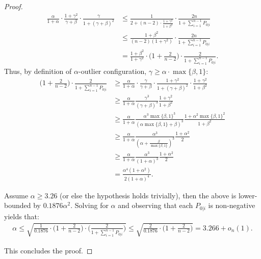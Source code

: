 \begin{proof}


\begin{align*}
    \frac{\alpha}{{1+\alpha}} \cdot \frac{1+\gamma^2}{\gamma+\beta} \cdot \frac{\gamma}{1+(\gamma+\beta)^2} 
    &\leq \frac{1}{2 + (n-2)\cdot \frac{1+\gamma^2}{1+\beta^2}}\cdot \frac{2n}{1 + \sum_{i=1}^{n-1} P_{0|i}} \\
    &\leq \frac{1+\beta^2}{(n-2)(1+\gamma^2)}\cdot \frac{2n}{1 + \sum_{i=1}^{n-1} P_{0|i}} \\
    &= \frac{1+\beta^2}{1+\gamma^2}\cdot \Big(1 + \frac{2}{n-2}\Big)\cdot \frac{2}{1+\sum_{i=1}^{n-1} P_{0|i}}.
\end{align*}
Thus, by definition of \(\alpha\)-outlier configuration, $\gamma \geq \alpha \cdot \max\{\beta,1\}$:
\begin{align*}
    \Big(1 + \frac{2}{n-2}\Big)\cdot \frac{2}{1+\sum_{i=1}^{n-1} P_{0|i}} &\geq \frac{\alpha}{{1+\alpha}} \cdot \frac{\gamma}{\gamma+\beta} \cdot \frac{1+\gamma^2}{1+(\gamma+\beta)^2} \cdot \frac{1+\gamma^2}{1+\beta^2} \\ 
    &\geq \frac{\alpha}{{1+\alpha}}\frac{\gamma^3}{(\gamma+\beta)^3}\frac{1 + \gamma^2}{1+\beta^2} \\ 
    &\geq \frac{\alpha}{{1+\alpha}}\frac{\alpha^3\max\{\beta,1\}^3}{(\alpha\max\{\beta,1\}+\beta)^3}\frac{1 + \alpha^2\max\{\beta,1\}^2}{1+\beta^2} \\
    &\geq \frac{\alpha}{{1+\alpha}}\frac{\alpha^3}{(\alpha+\frac{\beta}{\max\{\beta,1\}})^3}\frac{1 + \alpha^2}{2} \\
    &\geq \frac{\alpha}{{1+\alpha}}\frac{\alpha^3}{(1+\alpha)^3}\frac{1 + \alpha^2}{2}\\
    &= {\frac{\alpha^4(1+\alpha^2)}{2(1+\alpha)^4}}. %
\end{align*}

Assume $\alpha \geq 3.26$ (or else the hypothesis holds trivially), then the above is lower-bounded by %
$0.1876 \alpha^2$.
Solving for $\alpha$ and observing that each $P_{0|i}$ is non-negative yields that:
\begin{align*}
    \alpha \leq \sqrt{\frac{1}{0.1876}\cdot\Big(1 + \frac{2}{n-2}\Big)\cdot \Big( \frac{{2}}{1+\sum_{i=1}^{n-1} P_{0|i}}\Big) } \leq \sqrt{\frac{2}{0.1876}\cdot\Big(1 + \frac{2}{n-2}\Big) } = 3.266 + o_n(1).
\end{align*}

This concludes the proof.
\end{proof}